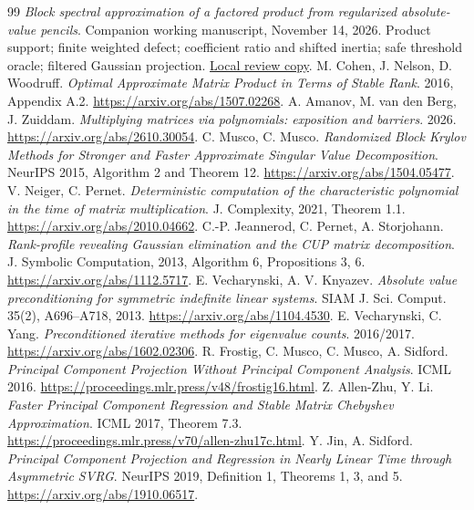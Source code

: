 \documentclass[11pt]{article}
\begin{document}
\begin{thebibliography}{99}
 \emph{Block spectral approximation of a factored product
from regularized absolute-value pencils}. Companion working manuscript,
November 14, 2026. Product support; finite weighted defect; coefficient
ratio and shifted inertia; safe threshold oracle; filtered Gaussian projection.
\href{absolute-pencil-spectral.pdf}{Local review copy}.
 M. Cohen, J. Nelson, D. Woodruff.
\emph{Optimal Approximate Matrix Product in Terms of Stable Rank}. 2016,
Appendix A.2. \url{https://arxiv.org/abs/1507.02268}.
 A. Amanov, M. van den Berg, J. Zuiddam.
\emph{Multiplying matrices via polynomials: exposition and barriers}. 2026.
\url{https://arxiv.org/abs/2610.30054}.
 C. Musco, C. Musco.
\emph{Randomized Block Krylov Methods for Stronger and Faster Approximate
Singular Value Decomposition}. NeurIPS 2015, Algorithm 2 and Theorem 12.
\url{https://arxiv.org/abs/1504.05477}.
 V. Neiger, C. Pernet.
\emph{Deterministic computation of the characteristic polynomial in the
time of matrix multiplication}. J. Complexity, 2021, Theorem 1.1.
\url{https://arxiv.org/abs/2010.04662}.
 C.-P. Jeannerod, C. Pernet, A. Storjohann.
\emph{Rank-profile revealing Gaussian elimination and the CUP matrix
decomposition}. J. Symbolic Computation, 2013, Algorithm 6, Propositions 3, 6.
\url{https://arxiv.org/abs/1112.5717}.
 E. Vecharynski, A. V. Knyazev.
\emph{Absolute value preconditioning for symmetric indefinite linear systems}.
SIAM J. Sci. Comput. 35(2), A696--A718, 2013.
\url{https://arxiv.org/abs/1104.4530}.
 E. Vecharynski, C. Yang.
\emph{Preconditioned iterative methods for eigenvalue counts}. 2016/2017.
\url{https://arxiv.org/abs/1602.02306}.
 R. Frostig, C. Musco, C. Musco, A. Sidford.
\emph{Principal Component Projection Without Principal Component Analysis}.
ICML 2016. \url{https://proceedings.mlr.press/v48/frostig16.html}.
 Z. Allen-Zhu, Y. Li.
\emph{Faster Principal Component Regression and Stable Matrix Chebyshev
Approximation}. ICML 2017, Theorem 7.3.
\url{https://proceedings.mlr.press/v70/allen-zhu17c.html}.
 Y. Jin, A. Sidford.
\emph{Principal Component Projection and Regression in Nearly Linear Time
through Asymmetric SVRG}. NeurIPS 2019, Definition 1, Theorems 1, 3, and 5.
\url{https://arxiv.org/abs/1910.06517}.
\end{thebibliography}
\end{document}
